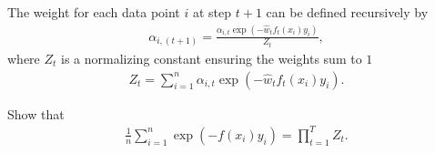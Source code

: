 \item {} The weight for each data point $i$ at step $t+1$ can be defined recursively by
 		\begin{align*}
 			\alpha_{i, (t+1)}
 			= \frac{\alpha_{i, t} \exp(-\hat{w}_t f_t(x_i) y_i)}{Z_t},
 		\end{align*}
 	where $Z_t$ is a normalizing constant ensuring the weights sum to $1$
 	\begin{align*}
 		Z_t = \sum_{i=1}^n \alpha_{i, t} \exp(-\hat{w}_t f_t(x_i) y_i).
 	\end{align*}
 
 Show that
 \begin{align*}
 	\frac{1}{n} \sum_{i=1}^n \exp(-f(x_i)y_i)= \prod_{t=1}^T Z_t. 
 \end{align*}